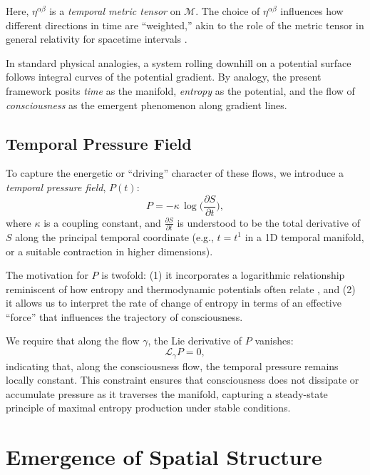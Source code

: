 \documentclass[12pt]{article}
\begin{document}
Here, $\eta^{\alpha\beta}$ is a \emph{temporal metric tensor} on $\mathcal{M}$. The choice of $\eta^{\alpha\beta}$ influences how different directions in time are ``weighted,'' akin to the role of the metric tensor in general relativity for spacetime intervals \cite{wald2010general}.

In standard physical analogies, a system rolling downhill on a potential surface follows integral curves of the potential gradient. By analogy, the present framework posits \emph{time} as the manifold, \emph{entropy} as the potential, and the flow of \emph{consciousness} as the emergent phenomenon along gradient lines.

\subsection{Temporal Pressure Field}
\label{subsec:pressure}

To capture the energetic or ``driving'' character of these flows, we introduce a \emph{temporal pressure field}, $P(t)$:
\begin{equation}
P = -\kappa \,\log\biggl(\frac{\partial S}{\partial t}\biggr),
\label{eq:pressure}
\end{equation}
where $\kappa$ is a coupling constant, and $\frac{\partial S}{\partial t}$ is understood to be the total derivative of $S$ along the principal temporal coordinate (e.g., $t = t^1$ in a 1D temporal manifold, or a suitable contraction in higher dimensions). 

The motivation for $P$ is twofold: 
(1) it incorporates a logarithmic relationship reminiscent of how entropy and thermodynamic potentials often relate \cite{callen1985thermodynamics}, and 
(2) it allows us to interpret the rate of change of entropy in terms of an effective ``force'' that influences the trajectory of consciousness.

We require that along the flow $\gamma$, the Lie derivative of $P$ vanishes:
\begin{equation}
\mathcal{L}_{\gamma} P = 0,
\end{equation}
indicating that, along the consciousness flow, the temporal pressure remains locally constant. This constraint ensures that consciousness does not dissipate or accumulate pressure as it traverses the manifold, capturing a steady-state principle of maximal entropy production under stable conditions.

\section{Emergence of Spatial Structure}
\label{sec:spatial_emergence}
\end{document}

